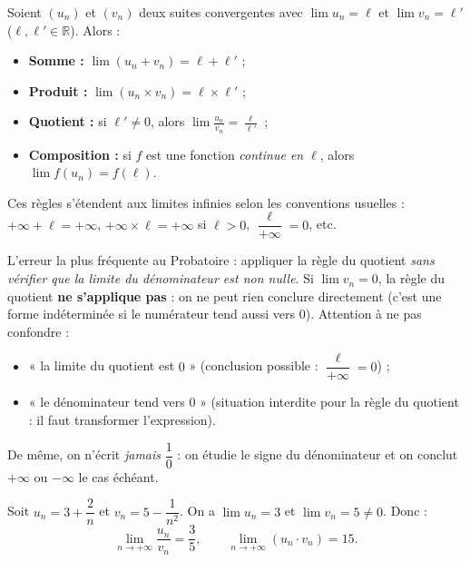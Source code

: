 \documentclass[11pt]{article}
\begin{document}
\begin{propriete}
Soient $(u_n)$ et $(v_n)$ deux suites convergentes avec $\lim u_n = \ell$ et $\lim v_n = \ell'$ ($\ell, \ell' \in \mathbb{R}$). Alors :
\begin{itemize}
\item \textbf{Somme :} $\lim (u_n + v_n) = \ell + \ell'$ ;
\item \textbf{Produit :} $\lim (u_n \times v_n) = \ell \times \ell'$ ;
\item \textbf{Quotient :} si $\ell' \neq 0$, alors $\displaystyle\lim \frac{u_n}{v_n} = \frac{\ell}{\ell'}$ ;
\item \textbf{Composition :} si $f$ est une fonction \emph{continue en $\ell$}, alors $\lim f(u_n) = f(\ell)$.
\end{itemize}
Ces règles s'étendent aux limites infinies selon les conventions usuelles : $+\infty + \ell = +\infty$, $+\infty \times \ell = +\infty$ si $\ell>0$, $\dfrac{\ell}{+\infty}=0$, etc.
\end{propriete}

\begin{attention}
L'erreur la plus fréquente au Probatoire : appliquer la règle du quotient \emph{sans vérifier que la limite du dénominateur est non nulle}. Si $\lim v_n = 0$, la règle du quotient \textbf{ne s'applique pas} : on ne peut rien conclure directement (c'est une forme indéterminée si le numérateur tend aussi vers $0$). Attention à ne pas confondre :
\begin{itemize}
\item « la limite du quotient est $0$ » (conclusion possible : $\dfrac{\ell}{+\infty} = 0$) ;
\item « le dénominateur tend vers $0$ » (situation interdite pour la règle du quotient : il faut transformer l'expression).
\end{itemize}
De même, on n'écrit \emph{jamais} $\dfrac{1}{0}$ : on étudie le signe du dénominateur et on conclut $+\infty$ ou $-\infty$ le cas échéant.
\end{attention}

\begin{exemplebox}
Soit $u_n = 3 + \dfrac{2}{n}$ et $v_n = 5 - \dfrac{1}{n^2}$. On a $\lim u_n = 3$ et $\lim v_n = 5 \neq 0$. Donc :
\[ \lim_{n\to+\infty} \frac{u_n}{v_n} = \frac{3}{5}, \qquad \lim_{n\to+\infty} (u_n \cdot v_n) = 15. \]
\end{exemplebox}
\end{document}
